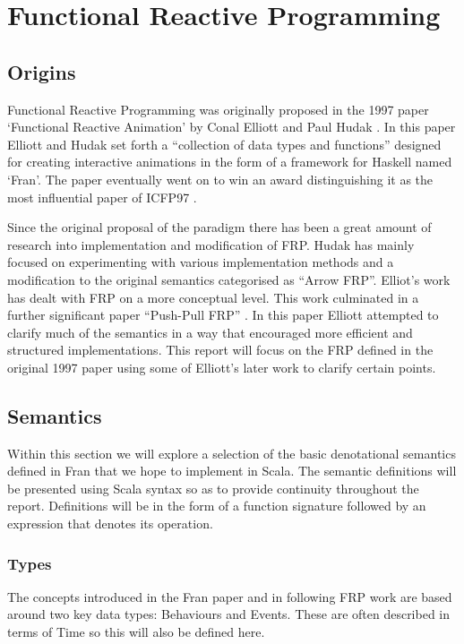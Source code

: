 \chapter{Functional Reactive Programming}
  \section{Origins}
  \label{sec:origins}
    Functional Reactive Programming was originally proposed in the 1997 paper `Functional
    Reactive Animation' by Conal Elliott and Paul Hudak \cite{Elliott1997}. In this paper Elliott and Hudak
    set forth a ``collection of data types and functions'' designed for creating interactive 
    animations in the form of a framework for Haskell named `Fran'. The paper eventually went on to
    win an award distinguishing it as the most influential paper of ICFP97 \cite{SIGPLAN}. 
    
    Since the original proposal of the paradigm there has been a great amount of research
    into implementation and modification of FRP. Hudak has mainly focused on experimenting with various
    implementation methods and a modification to the original semantics categorised as ``Arrow FRP''. Elliot's
    work has dealt with FRP on a more conceptual level. This work culminated in a further significant paper
    ``Push-Pull FRP'' \cite{Elliott2009}. In this paper Elliott attempted to clarify much of the semantics in a way that encouraged more efficient 
    and
    structured implementations. This report will focus on the FRP defined in the original 1997 paper using
    some of Elliott's later work to clarify certain points.

  \section{Semantics}
    \label{sec:semantics}
    Within this section we will explore a selection of the basic denotational semantics defined in Fran
    that we hope to implement in Scala. The semantic definitions will
    be presented using Scala syntax so as to provide continuity throughout the report. Definitions will
    be in the form of a function signature followed by an expression that denotes its operation.
  
    \subsection{Types}
      The concepts introduced in the Fran paper and in following FRP work are based around two key data types: 
      Behaviours and Events. These are often described in terms of Time so this will also be defined here.
      
